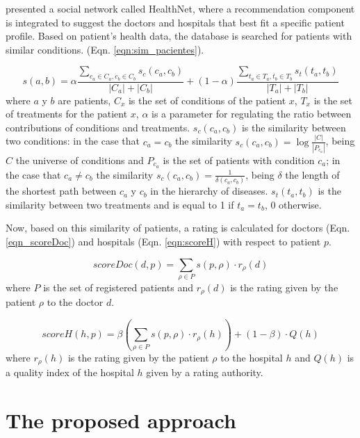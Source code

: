 \documentclass[sustainability,article,submit,pdftex,moreauthors]{Definitions/mdpi}
\begin{document}
\citet{narducci2015recommender} presented a social network called HealthNet, where a recommendation component is integrated to suggest the doctors and hospitals that best fit a specific patient profile. Based on patient's health data, the database is searched for patients with similar conditions. (Eqn. \ref{eqn:sim_pacientes}).

\begin{equation}
	\label{eqn:sim_pacientes}
	s(a,b)  = \alpha \frac{\sum_{c_a\in C_a,c_b\in C_b} s_c(c_a, c_b)}{|C_a|+|C_b|} + (1-\alpha)\frac{\sum_{t_a\in T_a,t_b\in T_b} s_t(t_a, t_b)}{|T_a|+|T_b|}
\end{equation}
where $a$ y $b$ are patients, $C_x$ is the set of conditions of the patient $x$, $T_x$ is the set of treatments for the patient $x$, $\alpha$ is a parameter for regulating the ratio between contributions of conditions and treatments. $s_c(c_a, c_b)$ is the similarity between two conditions: in the case that $c_a = c_b$ the similarity $s_c(c_a, c_b) = \log \frac{|C|}{|P_{c_a}|}$, being $C$ the universe of conditions and $P_{c_a}$ is the set of patients with condition $c_a$; in the case that $c_a \neq c_b$ the similarity $s_c(c_a, c_b) = \frac{1}{\delta (c_a,c_b)}$, being $\delta$ the length of the shortest path between $c_a$ y $c_b$ in the hierarchy of diseases. $s_t(t_a, t_b)$ is the similarity between two treatments and is equal to 1 if $t_a = t_b$, 0 otherwise.

Now, based on this similarity of patients, a rating is calculated for doctors (Eqn. \ref{eqn_scoreDoc}) and hospitals (Eqn. \ref{eqn:scoreH}) with respect to patient $p$.

\begin{equation}
	\label{eqn_scoreDoc}
	scoreDoc(d,p) = \sum_{\rho \in P}s(p,\rho)\cdot r_\rho (d)
\end{equation}
where $P$ is the set of registered patients and $r_\rho (d)$ is the rating given by the patient $\rho$ to the doctor $d$.

\begin{equation}
	\label{eqn:scoreH}
	scoreH(h,p) = \beta \left( \sum_{\rho \in P} s(p, \rho) \cdot r_\rho(h) \right) + (1-\beta) \cdot Q(h)
\end{equation}
where $r_\rho (h)$ is the rating given by the patient $\rho$ to the hospital $h$ and $Q(h)$ is a quality index of the hospital $h$ given by a rating authority.


\section{The proposed approach}
\end{document}
